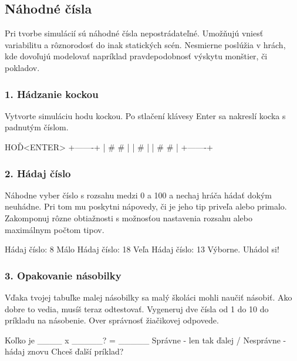 
\subsection{Náhodné čísla}
Pri tvorbe simulácií sú náhodné čísla nepostrádateľné. Umožňujú vniesť variabilitu a rôznorodosť do inak statických scén. Nesmierne poslúžia v hrách, kde dovoľujú modelovať napríklad pravdepodobnosť výskytu monštier, či pokladov.


\subsubsection*{1. Hádzanie kockou}
Vytvorte simuláciu hodu kockou. Po stlačení klávesy Enter sa nakreslí kocka s padnutým číslom.

\begin{code}
HOĎ<ENTER>
+-------+
| #   # |
|   #   |
| #   # |
+-------+
\end{code}

\subsubsection*{2. Hádaj číslo}
Náhodne vyber číslo s rozsahu medzi 0 a 100 a nechaj hráča hádať dokým neuhádne. Pri tom mu poskytni nápovedy, či je jeho tip priveľa alebo primalo. Zakomponuj rôzne obtiažnosti s možnosťou nastavenia rozsahu alebo maximálnym počtom tipov.

\begin{code}
Hádaj číslo: 8
Málo
Hádaj číslo: 18
Veľa
Hádaj číslo: 13
Výborne. Uhádol si!
\end{code}

\subsubsection*{3. Opakovanie násobilky}
Vďaka tvojej tabuľke malej násobilky sa malý školáci mohli naučiť násobiť. Ako dobre to vedia, musíš teraz odtestovať. Vygeneruj dve čísla od 1 do 10 do príkladu na násobenie. Over správnosť žiačikovej odpovede.

\begin{code}
Koľko je ____ x _____?
= _____
Správne - len tak ďalej / Nesprávne - hádaj znovu
Chceš ďalší príklad?
\end{code}
 
